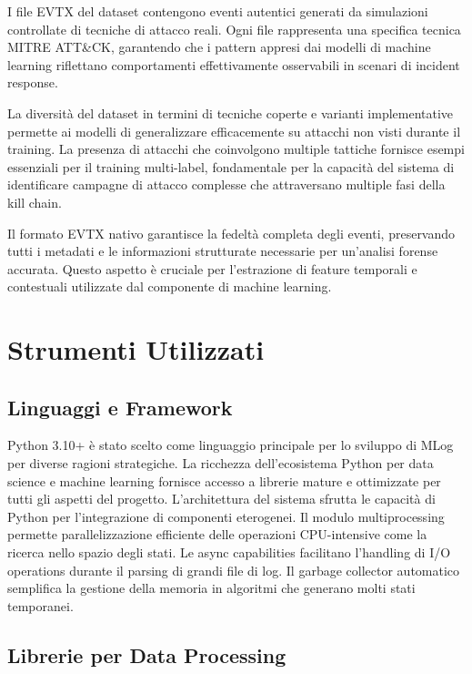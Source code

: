 \documentclass[12pt,a4paper]{report}
\theoremstyle{definition}
\begin{document}
I file EVTX del dataset contengono eventi autentici generati da simulazioni controllate di tecniche di attacco reali. Ogni file rappresenta una specifica tecnica MITRE ATT\&CK, garantendo che i pattern appresi dai modelli di machine learning riflettano comportamenti effettivamente osservabili in scenari di incident response.

La diversità del dataset in termini di tecniche coperte e varianti implementative permette ai modelli di generalizzare efficacemente su attacchi non visti durante il training. La presenza di attacchi che coinvolgono multiple tattiche fornisce esempi essenziali per il training multi-label, fondamentale per la capacità del sistema di identificare campagne di attacco complesse che attraversano multiple fasi della kill chain.

Il formato EVTX nativo garantisce la fedeltà completa degli eventi, preservando tutti i metadati e le informazioni strutturate necessarie per un'analisi forense accurata. Questo aspetto è cruciale per l'estrazione di feature temporali e contestuali utilizzate dal componente di machine learning.

\chapter{Strumenti Utilizzati}

\section{Linguaggi e Framework}

Python 3.10+ è stato scelto come linguaggio principale per lo sviluppo di MLog per diverse ragioni strategiche. La ricchezza dell'ecosistema Python per data science e machine learning fornisce accesso a librerie mature e ottimizzate per tutti gli aspetti del progetto. L'architettura del sistema sfrutta le capacità di Python per l'integrazione di componenti eterogenei. Il modulo multiprocessing permette parallelizzazione efficiente delle operazioni CPU-intensive come la ricerca nello spazio degli stati. Le async capabilities facilitano l'handling di I/O operations durante il parsing di grandi file di log. Il garbage collector automatico semplifica la gestione della memoria in algoritmi che generano molti stati temporanei.

\section{Librerie per Data Processing}
\end{document}
